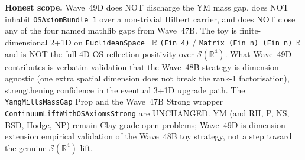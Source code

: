 \begin{remark}
\textbf{Honest scope.} Wave~49D does NOT discharge the YM mass gap, does NOT inhabit \texttt{OSAxiomBundle 1} over a non-trivial Hilbert carrier, and does NOT close any of the four named mathlib gaps from Wave~47B. The toy is finite-dimensional 2+1D on \texttt{EuclideanSpace } $\mathbb{R}$ \texttt{(Fin 4)} / \texttt{Matrix (Fin n) (Fin n)} $\mathbb{R}$ and is NOT the full 4D OS reflection positivity over $\mathcal{S}(\mathbb{R}^4)$. What Wave~49D contributes is verbatim validation that the Wave~48B strategy is dimension-agnostic (one extra spatial dimension does not break the rank-1 factorisation), strengthening confidence in the eventual 3+1D upgrade path. The \texttt{YangMillsMassGap} Prop and the Wave~47B Strong wrapper \texttt{ContinuumLiftWithOSAxiomsStrong} are UNCHANGED. YM (and RH, P, NS, BSD, Hodge, NP) remain Clay-grade open problems; Wave~49D is dimension-extension empirical validation of the Wave~48B toy strategy, not a step toward the genuine $\mathcal{S}(\mathbb{R}^4)$ lift.
\end{remark}

